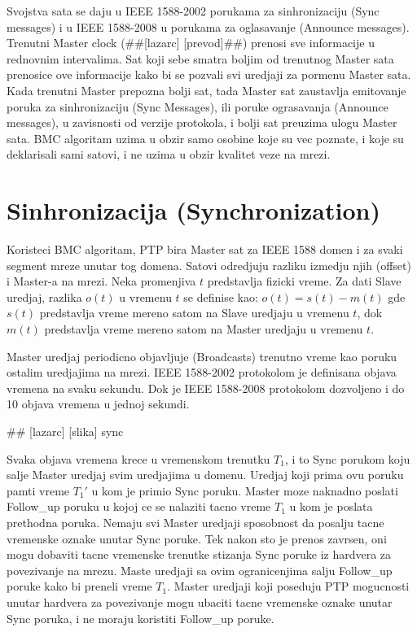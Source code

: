 \documentclass[a4paper,12pt, master]{etf}
\begin{document}
	Svojstva sata se daju u IEEE 1588-2002 porukama za sinhronizaciju (Sync messages) i u IEEE
	1588-2008 u porukama za oglasavanje (Announce messages). Trenutni Master clock (\#\#[lazarc]
	[prevod]\#\#) prenosi sve informacije u rednovnim intervalima. Sat koji sebe smatra boljim od
	trenutnog Master sata prenosice ove informacije kako bi se pozvali svi uredjaji za pormenu
	Master sata. Kada trenutni Master prepozna bolji sat, tada Master sat zaustavlja emitovanje
	poruka za sinhronizaciju (Sync Messages), ili poruke ograsavanja (Announce messages), u
	zavisnosti od verzije protokola, i bolji sat preuzima ulogu Master sata. BMC algoritam uzima u
	obzir samo osobine koje su vec poznate, i koje su deklarisali sami satovi, i ne uzima u obzir
	kvalitet veze na mrezi.

	\section{Sinhronizacija (Synchronization)}

	Koristeci BMC algoritam, PTP bira Master sat za IEEE 1588 domen i za svaki segment mreze unutar
	tog domena.
	Satovi odredjuju razliku izmedju njih (offset) i Master-a na mrezi. Neka promenjiva $t$
	predstavlja fizicki vreme. Za dati Slave uredjaj, razlika $o(t)$ u vremenu $t$ se definise kao:
	$o(t) = s(t) - m(t)$
	gde $s(t)$ predstavlja vreme mereno satom na Slave uredjaju u vremenu $t$, dok $m(t)$
	predstavlja vreme mereno satom na Master uredjaju u vremenu $t$.

	Master uredjaj periodicno objavljuje (Broadcasts) trenutno vreme kao poruku ostalim uredjajima
	na mrezi. IEEE 1588-2002 protokolom je definisana objava vremena na svaku sekundu. Dok je IEEE
	1588-2008 protokolom dozvoljeno i do 10 objava vremena u jednoj sekundi.

	\#\# [lazarc] [slika] sync

	Svaka objava vremena krece u vremenskom trenutku $T_1$, i to Sync porukom koju salje Master
	uredjaj svim uredjajima u domenu. Uredjaj koji prima ovu poruku pamti vreme $T_1'$ u kom je
	primio Sync poruku. Master moze naknadno poslati Follow\_up poruku u kojoj ce se nalaziti tacno
	vreme $T_1$ u kom je poslata prethodna poruka. Nemaju svi Master uredjaji sposobnost da posalju
	tacne vremenske oznake unutar Sync poruke. Tek nakon sto je prenos zavrsen, oni mogu dobaviti
	tacne vremenske trenutke stizanja Sync poruke iz hardvera za povezivanje na mrezu. Maste
	uredjaji sa ovim ogranicenjima salju Follow\_up poruke kako bi preneli vreme $T_1$. Master
	uredjaji koji poseduju PTP mogucnosti unutar hardvera za povezivanje mogu ubaciti tacne
	vremenske oznake unutar Sync poruka, i ne moraju koristiti Follow\_up poruke.
\end{document}
